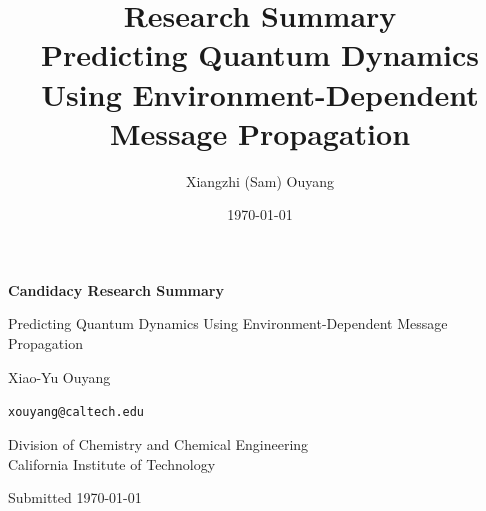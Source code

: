 \documentclass[12pt]{article}
\title{Research Summary \\[0.25em]
       \large Predicting Quantum Dynamics Using Environment-Dependent Message Propagation }
\author{Xiangzhi (Sam) Ouyang}
\date{\today}
\begin{document}
\begin{titlepage}
  \centering
  \vspace*{2cm}
  {\Large \bfseries Candidacy Research Summary\par}
  \vspace{1.5cm}
  {\LARGE Predicting Quantum Dynamics Using Environment-Dependent Message Propagation\par}
  \vspace{2cm}
  {\large Xiao-Yu Ouyang \par}
  \vspace{0.5cm}
  {\normalsize \texttt{xouyang@caltech.edu} \par}
  \vspace{1.5cm}
  {\normalsize Division of Chemistry and Chemical Engineering \\
               California Institute of Technology \par}
  \vfill
  {\normalsize Submitted \today \par}
\end{titlepage}

\begin{singlespace}
\tableofcontents
\end{singlespace}
\newpage
\end{document}
